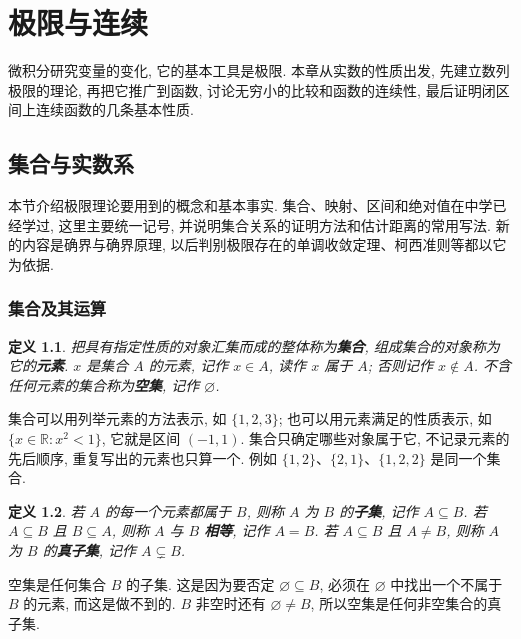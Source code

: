 \documentclass[UTF8,openany]{ctexbook}
\theoremstyle{chinesetextbook}
\newtheorem{definition}{定义}[section]
\begin{document}
\tableofcontents
\clearpage
\chapter{极限与连续}
微积分研究变量的变化, 它的基本工具是极限. 本章从实数的性质出发, 先建立数列极限的理论, 再把它推广到函数, 讨论无穷小的比较和函数的连续性, 最后证明闭区间上连续函数的几条基本性质.
\section{集合与实数系}
本节介绍极限理论要用到的概念和基本事实. 集合、映射、区间和绝对值在中学已经学过, 这里主要统一记号, 并说明集合关系的证明方法和估计距离的常用写法. 新的内容是确界与确界原理, 以后判别极限存在的单调收敛定理、柯西准则等都以它为依据.
\subsection{集合及其运算}
\begin{definition}
把具有指定性质的对象汇集而成的整体称为\textbf{集合}, 组成集合的对象称为它的\textbf{元素}. $x$ 是集合 $A$ 的元素, 记作 $x\in A$, 读作 $x$ 属于 $A$; 否则记作 $x\notin A$. 不含任何元素的集合称为\textbf{空集}, 记作 $\varnothing$.
\end{definition}
集合可以用列举元素的方法表示, 如 $\{1,2,3\}$; 也可以用元素满足的性质表示, 如 $\{x\in\mathbb R:x^2<1\}$, 它就是区间 $(-1,1)$. 集合只确定哪些对象属于它, 不记录元素的先后顺序, 重复写出的元素也只算一个. 例如 $\{1,2\}$、$\{2,1\}$、$\{1,2,2\}$ 是同一个集合.
\begin{definition}
若 $A$ 的每一个元素都属于 $B$, 则称 $A$ 为 $B$ 的\textbf{子集}, 记作 $A\subseteq B$. 若 $A\subseteq B$ 且 $B\subseteq A$, 则称 $A$ 与 $B$ \textbf{相等}, 记作 $A=B$. 若 $A\subseteq B$ 且 $A\ne B$, 则称 $A$ 为 $B$ 的\textbf{真子集}, 记作 $A\subsetneq B$.
\end{definition}
空集是任何集合 $B$ 的子集. 这是因为要否定 $\varnothing\subseteq B$, 必须在 $\varnothing$ 中找出一个不属于 $B$ 的元素, 而这是做不到的. $B$ 非空时还有 $\varnothing\ne B$, 所以空集是任何非空集合的真子集.
\end{document}
